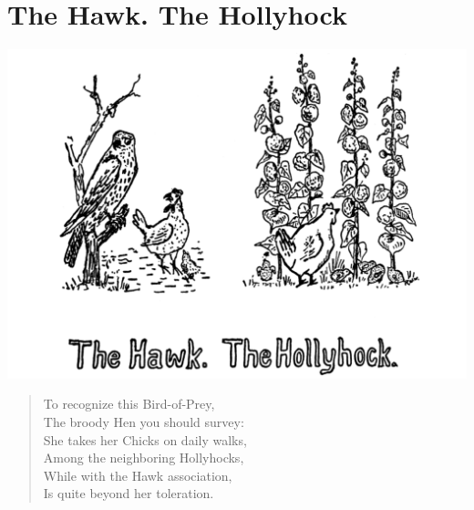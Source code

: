 \documentclass[letterpaper, 10pt, openany]{memoir}
\begin{document}
\chapter{The Hawk. The Hollyhock}
\includegraphics[width=1\textwidth]{f-p09.png}
\vspace{\onelineskip}
\begin{verse}\huge
To recognize this Bird-of-Prey,\\
The broody Hen you should survey:\\
She takes her Chicks on daily walks,\\
Among the neighboring Hollyhocks,\\
While with the Hawk association,\\
Is quite beyond her toleration.\\
\end{verse}
\vspace{\onelineskip}
\end{document}
